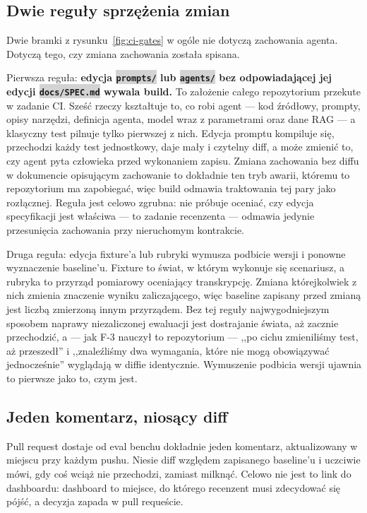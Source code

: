 \documentclass[11pt,a4paper]{article}
\newcommand{\repopath}[1]{\colorbox{lightgray}{\texttt{#1}}}
\newcommand{\finding}[1]{{\color{primaryblue}\textbf{#1}}}
\begin{document}
\subsection{Dwie reguły sprzężenia zmian}

Dwie bramki z rysunku~\ref{fig:ci-gates} w ogóle nie dotyczą zachowania agenta. Dotyczą tego, czy zmiana zachowania została spisana.

Pierwsza reguła: \finding{edycja \repopath{prompts/} lub \repopath{agents/} bez odpowiadającej jej edycji \repopath{docs/SPEC.md} wywala build.} To założenie całego repozytorium przekute w zadanie CI. Sześć rzeczy kształtuje to, co robi agent --- kod źródłowy, prompty, opisy narzędzi, definicja agenta, model wraz z parametrami oraz dane RAG --- a klasyczny test pilnuje tylko pierwszej z nich. Edycja promptu kompiluje się, przechodzi każdy test jednostkowy, daje mały i czytelny diff, a może zmienić to, czy agent pyta człowieka przed wykonaniem zapisu. Zmiana zachowania bez diffu w dokumencie opisującym zachowanie to dokładnie ten tryb awarii, któremu to repozytorium ma zapobiegać, więc build odmawia traktowania tej pary jako rozłącznej. Reguła jest celowo zgrubna: nie próbuje oceniać, czy edycja specyfikacji jest właściwa --- to zadanie recenzenta --- odmawia jedynie przesunięcia zachowania przy nieruchomym kontrakcie.

Druga reguła: edycja fixture'a lub rubryki wymusza podbicie wersji i ponowne wyznaczenie baseline'u. Fixture to świat, w którym wykonuje się scenariusz, a rubryka to przyrząd pomiarowy oceniający transkrypcję. Zmiana którejkolwiek z nich zmienia znaczenie wyniku zaliczającego, więc baseline zapisany przed zmianą jest liczbą zmierzoną innym przyrządem. Bez tej reguły najwygodniejszym sposobem naprawy niezaliczonej ewaluacji jest dostrajanie świata, aż zacznie przechodzić, a --- jak F-3 nauczył to repozytorium --- ,,po cichu zmieniliśmy test, aż przeszedł'' i ,,znaleźliśmy dwa wymagania, które nie mogą obowiązywać jednocześnie'' wyglądają w diffie identycznie. Wymuszenie podbicia wersji ujawnia to pierwsze jako to, czym jest.

\subsection{Jeden komentarz, niosący diff}

Pull request dostaje od eval benchu dokładnie jeden komentarz, aktualizowany w miejscu przy każdym pushu. Niesie diff względem zapisanego baseline'u i uczciwie mówi, gdy coś wciąż nie przechodzi, zamiast milknąć. Celowo nie jest to link do dashboardu: dashboard to miejsce, do którego recenzent musi zdecydować się pójść, a decyzja zapada w pull requeście.
\end{document}
